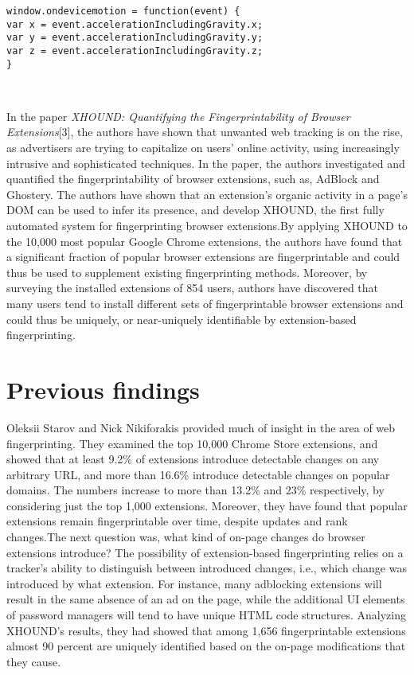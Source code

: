 \documentclass[journal]{IEEEtran}
\begin{document}
\medskip
\begin{enumerate}
\begin{lstlisting}
window.ondevicemotion = function(event) {
var x = event.accelerationIncludingGravity.x; 
var y = event.accelerationIncludingGravity.y; 
var z = event.accelerationIncludingGravity.z;
}
\end{lstlisting}
\noindent{}\\
\end{enumerate}



In the paper \textit{XHOUND: Quantifying the Fingerprintability of Browser
Extensions}[3], the authors have shown that unwanted web tracking is on the rise,
as advertisers are trying to capitalize on users’ online activity, using
increasingly intrusive and sophisticated techniques. In the paper, the authors
investigated and quantified the fingerprintability of browser extensions, such
as, AdBlock and Ghostery. The authors have shown that an extension’s organic
activity in a page’s DOM can be used to infer its presence, and develop XHOUND,
the first fully automated system for fingerprinting browser extensions.By
applying XHOUND to the 10,000 most popular Google Chrome extensions, the authors
have found that a significant fraction of popular browser extensions are
fingerprintable and could thus be used to supplement existing fingerprinting
methods. Moreover, by surveying the installed extensions of 854 users, authors
have discovered that many users tend to install different sets of
fingerprintable browser extensions and could thus be uniquely, or near-uniquely
identifiable by extension-based fingerprinting.

\section*{Previous findings}

Oleksii Starov and Nick Nikiforakis provided much of insight in the area of web
fingerprinting. They examined the top 10,000 Chrome Store extensions, and showed that at
least 9.2\% of extensions introduce detectable changes on any arbitrary URL, and more
than 16.6\% introduce detectable changes on popular domains. The numbers increase to more
than 13.2\% and 23\% respectively, by considering just the top 1,000 extensions.
Moreover, they have found that popular extensions remain fingerprintable over time,
despite updates and rank changes.The next question was, what kind of on-page changes do
browser extensions introduce? The possibility of extension-based fingerprinting relies on
a tracker’s ability to distinguish between introduced changes, i.e., which change was
introduced by what extension. For instance, many adblocking extensions will result in the
same absence of an ad on the page, while the additional UI elements of password managers
will tend to have unique HTML code structures. Analyzing XHOUND’s results, they had
showed that among 1,656 fingerprintable extensions almost 90 percent are uniquely
identified based on the on-page modifications that they cause.
\end{document}
